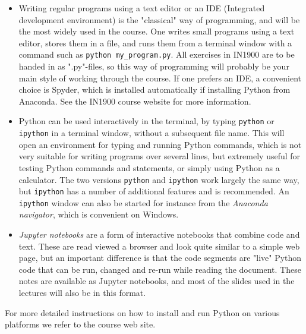 \documentclass[graybox,envcountchap,sectrefs,final]{svmonodo}
\begin{document}
\begin{itemize}
  \item Writing regular programs using a text editor or an IDE (Integrated development environment) is the
    "classical" way of programming, and will be the most widely used in the course. One writes small programs using a
    text editor, stores them in a file, and runs them from a terminal window with a command such as \Verb!python my_program.py!.
    All exercises in IN1900 are to be handed in as ".py"-files, so this way of programming will probably be
    your main style of working through the course. If one prefers an IDE, a convenient choice is Spyder, which
    is installed automatically if installing Python from Anaconda. See the IN1900 course website for more information.

  \item Python can be used interactively in the terminal, by typing \texttt{python} or \texttt{ipython} in a terminal window,
    without a subsequent file name. This will open an environment for typing and running Python commands, which is not very
    suitable for writing programs over several lines, but extremely useful for testing Python commands
    and statements, or simply
    using Python as a calculator. The two versions \texttt{python} and \texttt{ipython} work largely the same way, but \texttt{ipython} has a
    number of additional features and is recommended. An \texttt{ipython} window can also be started for instance
    from the \emph{Anaconda navigator}, which is convenient on Windows.

  \item \emph{Jupyter notebooks} are a form of interactive notebooks that combine code and text. These are read viewed a
    browser and look quite similar to a simple web page, but an important difference is that the code segments are "live"
    Python code that can be run, changed and re-run while reading the document. These notes are available as Jupyter
    notebooks, and most of the slides used in the lectures will also be in this format.
\end{itemize}

\noindent
For more detailed instructions on how to install and run Python on various platforms we refer to the course web site.
\end{document}
